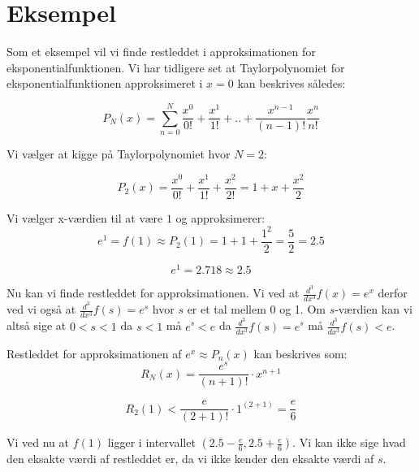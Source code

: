 \section{Eksempel}
Som et eksempel vil vi finde restleddet i approksimationen for eksponentialfunktionen.
Vi har tidligere set at Taylorpolynomiet for eksponentialfunktionen approksimeret i $x=0$ kan beskrives således:

\[
P_N(x)=\sum^{N}_{n=0}\frac{x^{0}}{0!}+\frac{x^{1}}{1!}+..+\frac{x^{n-1}}{(n-1)!}\frac{x^{n}}{n!}
\]

Vi vælger at kigge på Taylorpolynomiet hvor $N=2$:

\[
P_2(x)=\frac{x^{0}}{0!}+\frac{x^{1}}{1!}+\frac{x^{2}}{2!}=1+x+\frac{x^{2}}{2}
\]

Vi vælger x-værdien til at være $1$ og approksimerer:
\[
e^{1}=f(1)\approx P_{2}(1)=1+1+\frac{1^{2}}{2}=\frac{5}{2}=2.5
\]

\[
e^{1}=2.718\approx 2.5
\]

Nu kan vi finde restleddet for approksimationen.
Vi ved at $\frac{d^3}{dx^3}f(x)=e^{x}$ derfor ved vi også at $\frac{d^3}{dx^3}f(s)=e^{s}$ hvor $s$ er et tal mellem 0 og 1. Om $s$-værdien kan vi altså sige at $0<s<1$ da $s<1$ må $e^{s}<e$ da $\frac{d^3}{dx^3}f(s)=e^{s}$ må $\frac{d^3}{dx^3}f(s)<e$.

Restleddet for approksimationen af $e^{x}\approx P_n(x)$ kan beskrives som:
\[
R_N(x)={\frac{e^{s}}{(n+1)!}}\cdot x^{n+1}
\]

\[
R_2(1)<\frac{e}{(2+1)!}\cdot1^{(2+1)}=\frac{e}{6}
\]

Vi ved nu at $f(1)$ ligger i intervallet $(2.5-\frac{e}{6} , 2.5+\frac{e}{6})$. Vi kan ikke sige hvad den eksakte værdi af restleddet er, da vi ikke kender den eksakte værdi af $s$.
